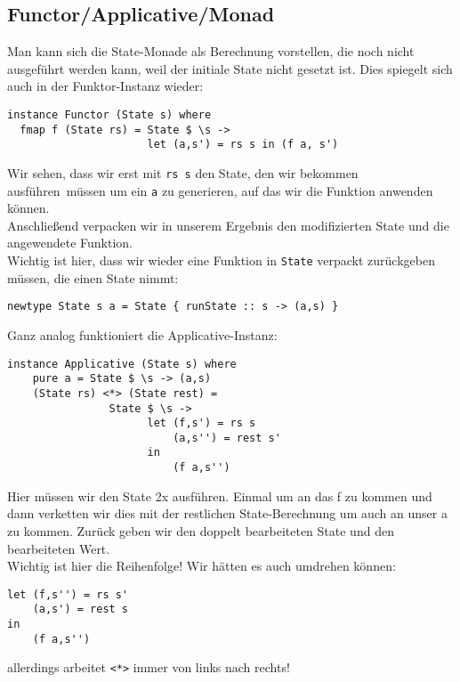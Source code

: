 \documentclass{beamer}
\begin{document}
\subsection{Functor/Applicative/Monad}
\begin{frame}[fragile]
Man kann sich die State-Monade als Berechnung vorstellen, die noch nicht ausgeführt werden kann, weil der initiale State nicht gesetzt ist. Dies spiegelt sich auch in der Funktor-Instanz wieder:
\pause
\begin{verbatim}
instance Functor (State s) where
  fmap f (State rs) = State $ \s -> 
                      let (a,s') = rs s in (f a, s')
\end{verbatim}
\pause
Wir sehen, dass wir erst mit \texttt{rs s} den State, den wir bekommen \glqq ausführen\grqq \ müssen um ein \texttt{a} zu generieren, auf das wir die Funktion anwenden können.\\
Anschließend verpacken wir in unserem Ergebnis den modifizierten State und die angewendete Funktion.\\
\pause
Wichtig ist hier, dass wir wieder eine Funktion in \texttt{State} verpackt zurückgeben müssen, die einen State nimmt:
\begin{verbatim}
newtype State s a = State { runState :: s -> (a,s) }
\end{verbatim}

\end{frame}

\begin{frame}[fragile]
Ganz analog funktioniert die Applicative-Instanz:
\begin{verbatim}
instance Applicative (State s) where
    pure a = State $ \s -> (a,s)
    (State rs) <*> (State rest) =
                State $ \s ->
                      let (f,s') = rs s
                          (a,s'') = rest s'
                      in
                          (f a,s'')
\end{verbatim}
\pause
Hier müssen wir den State 2x ausführen. Einmal um an das f zu kommen und dann verketten wir dies mit der restlichen State-Berechnung um auch an unser a zu kommen. Zurück geben wir den doppelt bearbeiteten State und den bearbeiteten Wert.\\
\pause
Wichtig ist hier die Reihenfolge! Wir hätten es auch umdrehen können:
\begin{verbatim}
let (f,s'') = rs s'
    (a,s') = rest s
in
    (f a,s'')
\end{verbatim}
allerdings arbeitet \texttt{<*>} immer von links nach rechts!
\end{frame}
\end{document}
